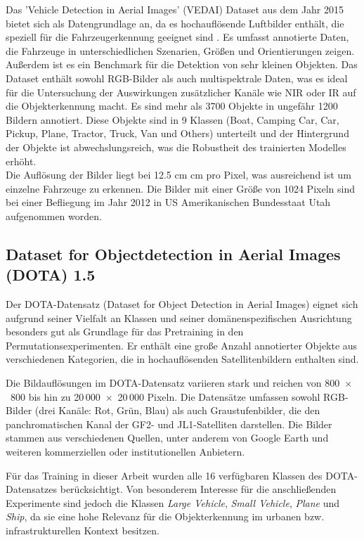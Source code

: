 Das 'Vehicle Detection in Aerial Images' (VEDAI) Dataset \cite{vedai_web}  aus dem Jahr 2015 bietet sich als Datengrundlage an, da es hochauflösende Luftbilder enthält, die speziell für die Fahrzeugerkennung geeignet sind \cite{Razakarivony2015}. Es umfasst annotierte Daten, die Fahrzeuge in unterschiedlichen Szenarien, Größen und Orientierungen zeigen. Außerdem ist es ein Benchmark für die Detektion von sehr kleinen Objekten. Das Dataset enthält sowohl RGB-Bilder als auch multispektrale Daten, was es ideal für die Untersuchung der Auswirkungen zusätzlicher Kanäle wie NIR oder IR auf die Objekterkennung macht. Es sind mehr als 3700 Objekte in ungefähr 1200 Bildern annotiert. Diese Objekte sind in 9 Klassen (Boat, Camping Car, Car, Pickup, Plane, Tractor, Truck, Van und Others) unterteilt und der Hintergrund der Objekte ist abwechslungsreich, was die Robustheit des trainierten Modelles erhöht. \\
Die Auflösung der Bilder liegt bei 12.5 cm  cm pro Pixel, was ausreichend ist um einzelne Fahrzeuge zu erkennen. Die Bilder mit einer Größe von 1024  Pixeln sind bei einer Befliegung im Jahr 2012 in US Amerikanischen Bundesstaat Utah aufgenommen worden. 



\subsection{Dataset for Objectdetection in Aerial Images (DOTA) 1.5}

Der DOTA-Datensatz (Dataset for Object Detection in Aerial Images) eignet sich aufgrund seiner Vielfalt an Klassen und seiner domänenspezifischen Ausrichtung besonders gut als Grundlage für das Pretraining in den Permutationsexperimenten. Er enthält eine große Anzahl annotierter Objekte aus verschiedenen Kategorien, die in hochauflösenden Satellitenbildern enthalten sind.

Die Bildauflösungen im DOTA-Datensatz variieren stark und reichen von 800~$\times$~800 bis hin zu 20\,000~$\times$~20\,000 Pixeln. Die Datensätze umfassen sowohl RGB-Bilder (drei Kanäle: Rot, Grün, Blau) als auch Graustufenbilder, die den panchromatischen Kanal der GF2- und JL1-Satelliten darstellen. Die Bilder stammen aus verschiedenen Quellen, unter anderem von Google Earth und weiteren kommerziellen oder institutionellen Anbietern.

Für das Training in dieser Arbeit wurden alle 16 verfügbaren Klassen des DOTA-Datensatzes berücksichtigt. Von besonderem Interesse für die anschließenden Experimente sind jedoch die Klassen \textit{Large Vehicle}, \textit{Small Vehicle}, \textit{Plane} und \textit{Ship}, da sie eine hohe Relevanz für die Objekterkennung im urbanen bzw. infrastrukturellen Kontext besitzen.

